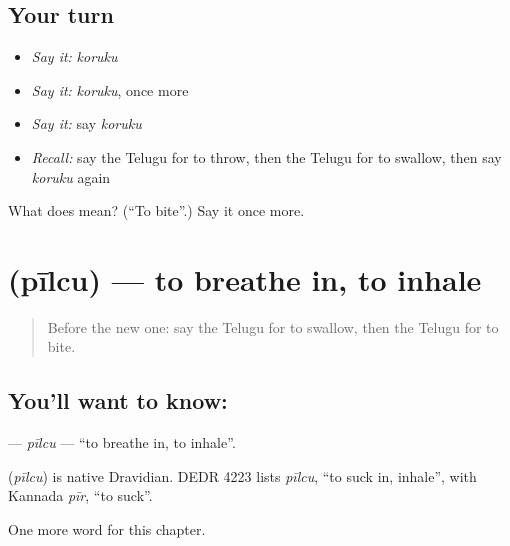 \subsection*{Your turn}
\begin{itemize}
\raggedright
  \item \emph{Say it:} \emph{koruku}
  \item \emph{Say it:} \emph{koruku}, once more
  \item \emph{Say it:} say \emph{koruku}
  \item \emph{Recall:} say the Telugu for to throw, then the Telugu for to swallow, then say \emph{koruku} again
\end{itemize}

\begin{tcolorbox}[breakable,colback=teal!4,colframe=teal!35!black,title={Before you move on}]
What does  mean? (\textquotedblleft{}To bite\textquotedblright{}.) Say it once more.
\end{tcolorbox}
\section[\texorpdfstring{\te{పీల్చు} (pīlcu)}{పీల్చు (pīlcu)}]{ (pīlcu) — to breathe in, to inhale}

\label{lesson:TE-C241-pilcu}



\begin{quote}
Before the new one: say the Telugu for to swallow, then the Telugu for to bite.
\end{quote}

\subsection*{You'll want to know: }
\textbf{} — \emph{pīlcu} — \textquotedblleft{}to breathe in, to inhale\textquotedblright{}.

\begin{cousinweb}
\textbf{} (\emph{pīlcu}) is native Dravidian. DEDR 4223 lists \emph{pīlcu}, \textquotedblleft{}to suck in, inhale\textquotedblright{}, with Kannada \emph{pīr}, \textquotedblleft{}to suck\textquotedblright{}.
\end{cousinweb}

\begin{grammarlens}[title={What you've built}]
One more word for this chapter.
\end{grammarlens}

